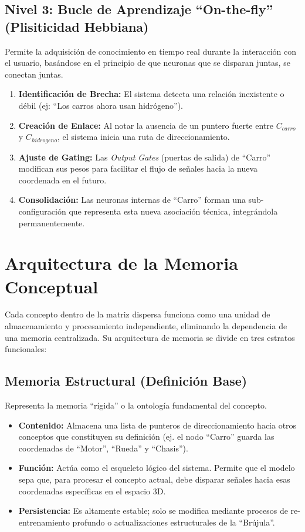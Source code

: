 \documentclass[12pt]{article}
\begin{document}
\subsection{Nivel 3: Bucle de Aprendizaje ``On-the-fly'' (Plisiticidad Hebbiana)}
Permite la adquisición de conocimiento en tiempo real durante la interacción con el usuario, basándose en el principio de que neuronas que se disparan juntas, se conectan juntas.
\begin{enumerate}
    \item \textbf{Identificación de Brecha:} El sistema detecta una relación inexistente o débil (ej: ``Los carros ahora usan hidrógeno'').
    \item \textbf{Creación de Enlace:} Al notar la ausencia de un puntero fuerte entre $C_{carro}$ y $C_{hidrogeno}$, el sistema inicia una ruta de direccionamiento.
    \item \textbf{Ajuste de Gating:} Las \textit{Output Gates} (puertas de salida) de ``Carro'' modifican sus pesos para facilitar el flujo de señales hacia la nueva coordenada en el futuro.
    \item \textbf{Consolidación:} Las neuronas internas de ``Carro'' forman una sub-configuración que representa esta nueva asociación técnica, integrándola permanentemente.
\end{enumerate}

\section{Arquitectura de la Memoria Conceptual}

Cada concepto dentro de la matriz dispersa funciona como una unidad de almacenamiento y procesamiento independiente, eliminando la dependencia de una memoria centralizada. Su arquitectura de memoria se divide en tres estratos funcionales:

\subsection{Memoria Estructural (Definición Base)}
Representa la memoria ``rígida'' o la ontología fundamental del concepto.
\begin{itemize}
    \item \textbf{Contenido:} Almacena una lista de punteros de direccionamiento hacia otros conceptos que constituyen su definición (ej. el nodo ``Carro'' guarda las coordenadas de ``Motor'', ``Rueda'' y ``Chasis'').
    \item \textbf{Función:} Actúa como el esqueleto lógico del sistema. Permite que el modelo sepa que, para procesar el concepto actual, debe disparar señales hacia esas coordenadas específicas en el espacio 3D.
    \item \textbf{Persistencia:} Es altamente estable; solo se modifica mediante procesos de re-entrenamiento profundo o actualizaciones estructurales de la ``Brújula''.
\end{itemize}
\end{document}
